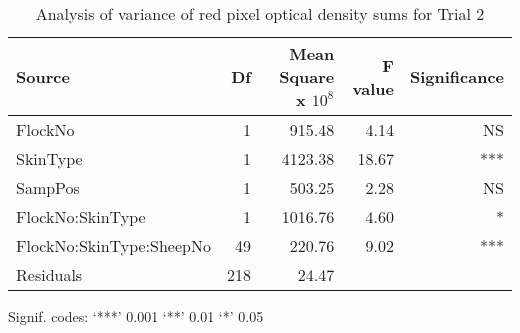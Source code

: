 \begin{table}[ht]
\centering
\captionsetup{width=1.0\textwidth}
\caption{Analysis of variance of red pixel optical density sums for Trial 2}
\label{tab:redpixelt2aov}

\begin{tabular}{lrrrr}
  \hline \rule{0pt}{12pt}
 Source & Df & Mean Square x $10^8$ & F value & Significance \\ 
  \hline
FlockNo                  & 1 &  915.48 & 4.14 & NS \\ 
  SkinType                 & 1 & 4123.38 & 18.67 & *** \\ 
  SampPos                  & 1 & 503.25 & 2.28 & NS \\ 
  FlockNo:SkinType         & 1 & 1016.76 & 4.60 & * \\ 
  FlockNo:SkinType:SheepNo & 49 & 220.76 & 9.02 & *** \\ 
  Residuals                & 218 & 24.47 &  &  \\ 
   \hline
\end{tabular}
\begin{tabbing}
  Signif. codes: ‘***’ 0.001 ‘**’ 0.01 ‘*’ 0.05  \\
\end{tabbing}
\end{table}

